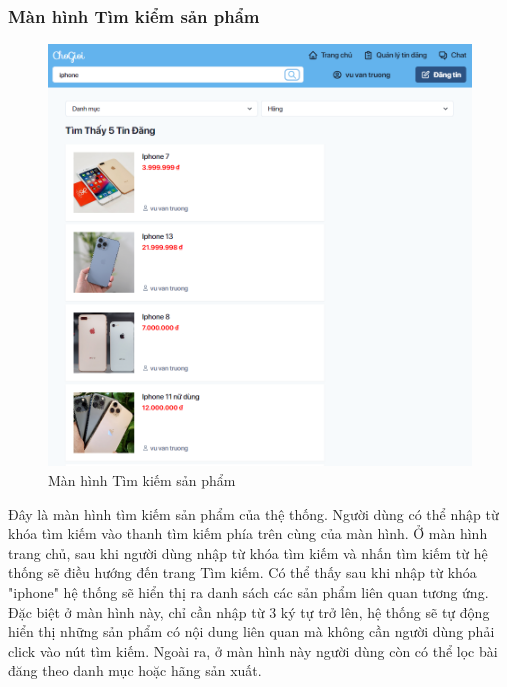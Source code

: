 \documentclass[../DoAn.tex]{subfiles}
\begin{document}
\subsubsection{Màn hình Tìm kiểm sản phẩm}
\begin{figure}[H]
    \centering
    \includegraphics[width=0.9\linewidth]{Hinhve/2-search.png}
    \caption{Màn hình Tìm kiếm sản phẩm}
    \label{fig:Fig1}
\end{figure}
Đây là màn hình tìm kiếm sản phẩm của thệ thống. Người dùng có thể nhập từ khóa tìm kiếm vào thanh tìm kiếm phía trên  cùng của màn hình. Ở màn hình trang chủ, sau khi người dùng nhập từ khóa tìm kiếm và nhấn tìm kiếm từ hệ thống sẽ điều hướng đến trang Tìm kiếm. Có thể thấy sau khi nhập từ khóa "iphone" hệ thống sẽ hiển thị ra danh sách các sản phẩm liên quan tương ứng. Đặc biệt ở màn hình này, chỉ cần nhập từ 3 ký tự trở lên, hệ thống sẽ tự động hiển thị những sản phẩm có nội dung liên quan mà không cần người dùng phải click vào nút tìm kiếm. Ngoài ra, ở màn hình này người dùng còn có thể lọc bài đăng theo danh mục hoặc hãng sản xuất.
\newpage
\end{document}
